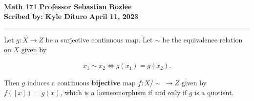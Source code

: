 \documentclass[12pt, twosided]{article}
\begin{document}
\noindent \textbf{Math 171} \hfill \textbf{Professor Sebastian Bozlee} \\
\textbf{Scribed by: Kyle Dituro} \hfill \textbf{April 11, 2023}\hrule
\vspace{.2in}

\begin{cor}
  Let \(g: X \to Z\) be a surjective continuous map.
  Let \(\sim\) be the equivalence relation on \(X\) given by

  \begin{align*}
    x_1 \sim x_2 \Longleftrightarrow g(x_1) = g(x_2).
  \end{align*}

  Then \(g\) induces a continuous \textbf{bijective} map \(f: X/\sim\ \to Z\) given by \(f([x]) = g(x)\), which is a homeomorphism if and only if \(g\) is a quotient.

  \begin{center}
  \end{center}
\end{cor}
\end{document}
